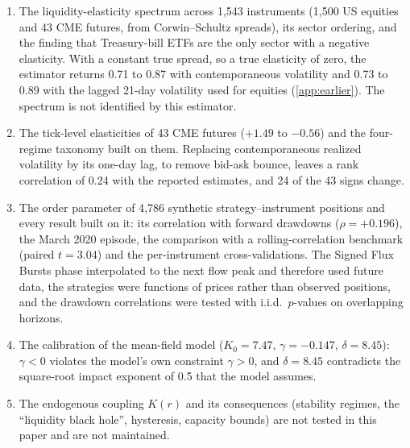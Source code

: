 \documentclass[preprint,12pt,authoryear]{elsarticle}
\begin{document}
\begin{enumerate}
\item The liquidity-elasticity spectrum across 1{,}543 instruments (1{,}500 US
equities and 43 CME futures, from Corwin--Schultz spreads), its sector
ordering, and the finding that Treasury-bill ETFs are the only sector with a
negative elasticity. With a constant true spread, so a true elasticity of zero,
the estimator returns 0.71 to 0.87 with contemporaneous volatility and 0.73 to
0.89 with the lagged 21-day volatility used for equities
(\ref{app:earlier}). The spectrum is not identified by this estimator.
\item The tick-level elasticities of 43 CME futures ($+1.49$ to $-0.56$) and
the four-regime taxonomy built on them. Replacing contemporaneous realized
volatility by its one-day lag, to remove bid-ask bounce, leaves a rank
correlation of 0.24 with the reported estimates, and 24 of the 43 signs change.
\item The order parameter of 4{,}786 synthetic strategy--instrument positions
and every result built on it: its correlation with forward drawdowns
($\rho = +0.196$), the March 2020 episode, the comparison with a
rolling-correlation benchmark (paired $t = 3.04$) and the per-instrument
cross-validations. The Signed Flux Bursts phase interpolated to the next flow
peak and therefore used future data, the strategies were functions of prices
rather than observed positions, and the drawdown correlations were tested with
i.i.d.\ $p$-values on overlapping horizons.
\item The calibration of the mean-field model ($K_0 = 7.47$, $\gamma = -0.147$,
$\delta = 8.45$): $\gamma < 0$ violates the model's own constraint
$\gamma > 0$, and $\delta = 8.45$ contradicts the square-root impact exponent
of 0.5 that the model assumes.
\item The endogenous coupling $K(r)$ and its consequences (stability regimes,
the ``liquidity black hole'', hysteresis, capacity bounds) are not tested in
this paper and are not maintained.
\end{enumerate}
\end{document}
